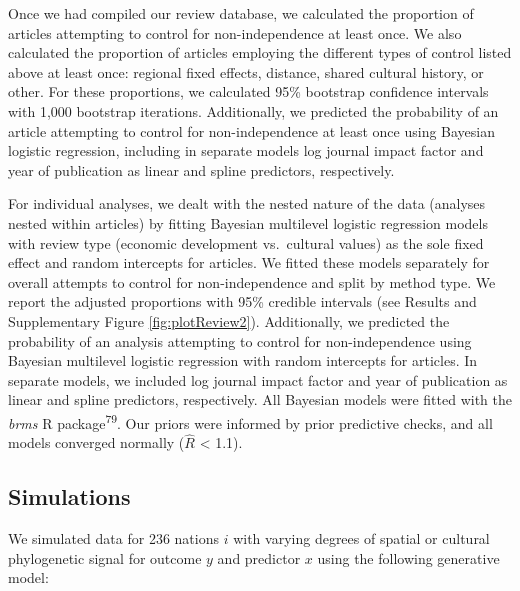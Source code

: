 \documentclass[
  man,floatsintext]{apa6}
\begin{document}
Once we had compiled our review database, we calculated the proportion of articles attempting to control for non-independence at least once. We also calculated the proportion of articles employing the different types of control listed above at least once: regional fixed effects, distance, shared cultural history, or other. For these proportions, we calculated 95\% bootstrap confidence intervals with 1,000 bootstrap iterations. Additionally, we predicted the probability of an article attempting to control for non-independence at least once using Bayesian logistic regression, including in separate models log journal impact factor and year of publication as linear and spline predictors, respectively.

For individual analyses, we dealt with the nested nature of the data (analyses nested within articles) by fitting Bayesian multilevel logistic regression models with review type (economic development vs.~cultural values) as the sole fixed effect and random intercepts for articles. We fitted these models separately for overall attempts to control for non-independence and split by method type. We report the adjusted proportions with 95\% credible intervals (see Results and Supplementary Figure \ref{fig:plotReview2}). Additionally, we predicted the probability of an analysis attempting to control for non-independence using Bayesian multilevel logistic regression with random intercepts for articles. In separate models, we included log journal impact factor and year of publication as linear and spline predictors, respectively. All Bayesian models were fitted with the \emph{brms} R package\textsuperscript{79}. Our priors were informed by prior predictive checks, and all models converged normally (\(\hat{R}\) \textless{} 1.1).

\hypertarget{simulations}{%
\subsection{Simulations}\label{simulations}}

We simulated data for 236 nations \(i\) with varying degrees of spatial or cultural phylogenetic signal for outcome \(y\) and predictor \(x\) using the following generative model:
\end{document}
